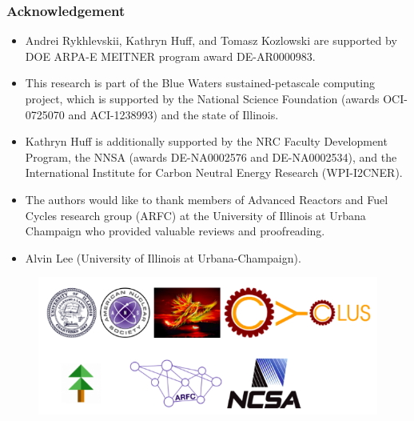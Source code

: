 \begin{frame}
\frametitle{Acknowledgement}
\begin{itemize}
	\item Andrei Rykhlevskii, Kathryn Huff, and Tomasz 	Kozlowski are 
	supported by DOE ARPA-E MEITNER program award DE-AR0000983.
	\item This research is part of the Blue Waters sustained-petascale 
	computing project, which is supported by the National Science Foundation 
	(awards OCI-0725070 and ACI-1238993) and the state of Illinois.
	\item Kathryn Huff is additionally supported by the NRC Faculty 
	Development Program, the NNSA (awards DE-NA0002576 and DE-NA0002534), and 
	the International Institute for Carbon Neutral Energy Research 
	(WPI-I2CNER).
	\item The authors would like to thank  members of Advanced Reactors and 
	Fuel Cycles	research group (ARFC) at the University of Illinois at Urbana 
	Champaign who provided valuable reviews and proofreading.
	\item Alvin Lee (University of Illinois at Urbana-Champaign).
\end{itemize}
\begin{figure}[t]
	\hspace*{-0.4in}
	\includegraphics[height=0.25\textheight]{./images/acks.png}
\end{figure}
\end{frame}